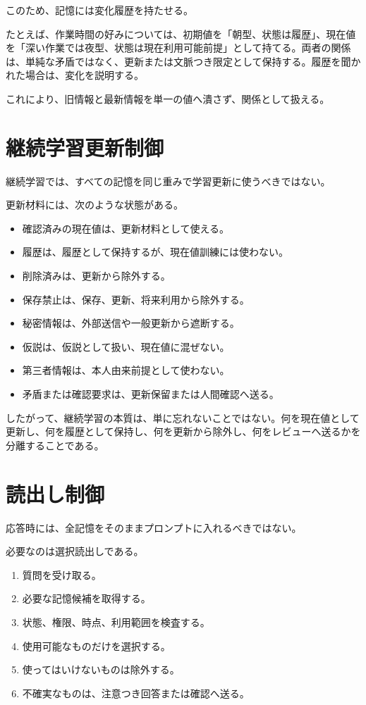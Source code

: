 \documentclass[12pt,a4paper]{article}
\begin{document}
このため、記憶には変化履歴を持たせる。

たとえば、作業時間の好みについては、初期値を「朝型、状態は履歴」、現在値を「深い作業では夜型、状態は現在利用可能前提」として持てる。両者の関係は、単純な矛盾ではなく、更新または文脈つき限定として保持する。履歴を聞かれた場合は、変化を説明する。

これにより、旧情報と最新情報を単一の値へ潰さず、関係として扱える。

\section{継続学習更新制御}\label{ux7d99ux7d9aux5b66ux7fd2ux66f4ux65b0ux5236ux5fa1}

継続学習では、すべての記憶を同じ重みで学習更新に使うべきではない。

更新材料には、次のような状態がある。

\begin{itemize}
\tightlist
\item
  確認済みの現在値は、更新材料として使える。
\item
  履歴は、履歴として保持するが、現在値訓練には使わない。
\item
  削除済みは、更新から除外する。
\item
  保存禁止は、保存、更新、将来利用から除外する。
\item
  秘密情報は、外部送信や一般更新から遮断する。
\item
  仮説は、仮説として扱い、現在値に混ぜない。
\item
  第三者情報は、本人由来前提として使わない。
\item
  矛盾または確認要求は、更新保留または人間確認へ送る。
\end{itemize}

したがって、継続学習の本質は、単に忘れないことではない。何を現在値として更新し、何を履歴として保持し、何を更新から除外し、何をレビューへ送るかを分離することである。

\section{読出し制御}\label{ux8aadux51faux3057ux5236ux5fa1}

応答時には、全記憶をそのままプロンプトに入れるべきではない。

必要なのは選択読出しである。

\begin{enumerate}
\def\labelenumi{\arabic{enumi}.}
\tightlist
\item
  質問を受け取る。
\item
  必要な記憶候補を取得する。
\item
  状態、権限、時点、利用範囲を検査する。
\item
  使用可能なものだけを選択する。
\item
  使ってはいけないものは除外する。
\item
  不確実なものは、注意つき回答または確認へ送る。
\end{enumerate}
\end{document}
